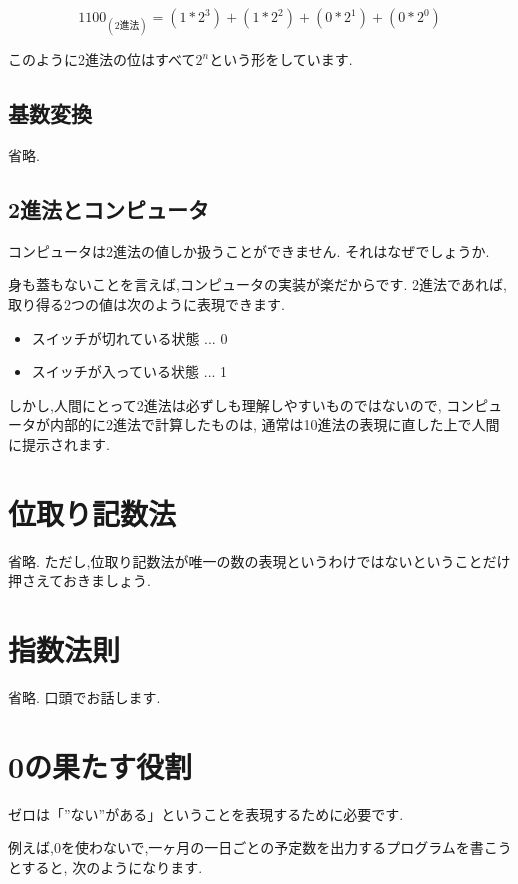 \documentclass[10pt, twocolumn]{jarticle}
\begin{document}
\begin{displaymath}
1100_{(2進法)} = (1 * 2^3) + (1 * 2^2) + (0 * 2^1) + (0 * 2^0)
\end{displaymath}

このように2進法の位はすべて$2^n$という形をしています.

\subsection{基数変換}

省略.

\subsection{2進法とコンピュータ}

コンピュータは2進法の値しか扱うことができません.
それはなぜでしょうか.

身も蓋もないことを言えば,コンピュータの実装が楽だからです.
2進法であれば,取り得る2つの値は次のように表現できます.

\begin{itemize}
  \item スイッチが切れている状態 ... 0
  \item スイッチが入っている状態 ... 1
\end{itemize}

しかし,人間にとって2進法は必ずしも理解しやすいものではないので,
コンピュータが内部的に2進法で計算したものは,
通常は10進法の表現に直した上で人間に提示されます.

\section{位取り記数法}

省略.
ただし,位取り記数法が唯一の数の表現というわけではないということだけ押さえておきましょう.

\section{指数法則}

省略.
口頭でお話します.

\section{0の果たす役割}

ゼロは「''ない''がある」ということを表現するために必要です.

例えば,0を使わないで,一ヶ月の一日ごとの予定数を出力するプログラムを書こうとすると,
次のようになります.
\end{document}
